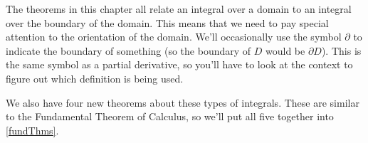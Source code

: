 The theorems in this chapter all relate an integral over a domain to an integral over the boundary of the domain.  This means that we need to pay special attention to the orientation of the domain.  We'll occasionally use the symbol $\partial$ to indicate the boundary of something (so the boundary of $D$ would be $\partial D$).  This is the same symbol as a partial derivative, so you'll have to look at the context to figure out which definition is being used.

We also have four new theorems about these types of integrals. These are similar to the Fundamental Theorem of Calculus, so we'll put all five together into \autoref{fundThms}.

\setboxwidth{100pt}


